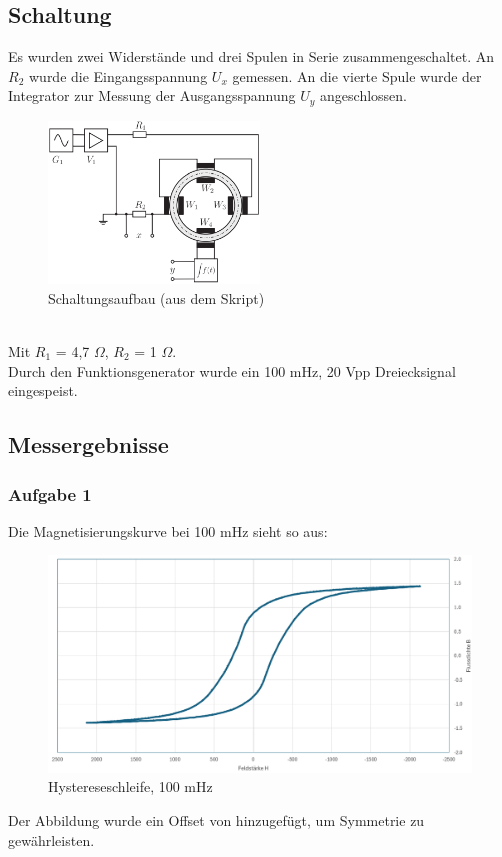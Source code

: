 \documentclass[a4paper,twoside,12pt,DIV=13,BCOR=5mm,numbers=noenddot,cleardoublepage=empty]{scrbook}
\begin{document}
    \subsection{Schaltung}

    Es wurden zwei Widerstände und drei Spulen in Serie zusammengeschaltet. An \textit{$R_2$} wurde die Eingangsspannung $U_x$ gemessen. An die vierte Spule wurde der Integrator zur Messung der Ausgangsspannung $U_y$ angeschlossen.
    \begin{figure}[h] 
    \centering
    \includegraphics[width=0.5\textwidth]{pictures/HystereseSchaltung.png} %
    \caption{Schaltungsaufbau (aus dem Skript)}
    \end{figure}
    \\
    Mit $R_1$ = 4,7 $\Omega$, $R_2$ = 1 $\Omega$. \\
    Durch den Funktionsgenerator wurde ein 100 mHz, 20 Vpp Dreiecksignal eingespeist.

    \newpage



    \subsection{Messergebnisse}


        
            \subsubsection{Aufgabe 1} 
            Die Magnetisierungskurve bei 100 mHz sieht so aus:

            \begin{figure}[h] 
            \centering
            \includegraphics[width=\textwidth]{pictures/50mHz.png} 
            \caption{Hystereseschleife, 100 mHz}
            \label{fig:meinbild}
             \end{figure}
		Der Abbildung wurde ein Offset von  hinzugefügt, um Symmetrie zu gewährleisten.
\end{document}

